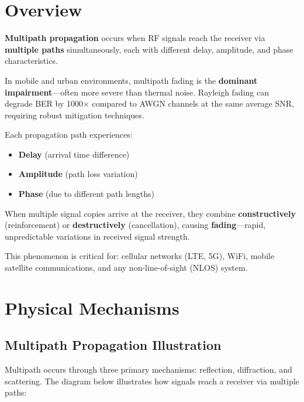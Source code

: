 \section{Overview}

\textbf{Multipath propagation} occurs when RF signals reach the receiver via \textbf{multiple paths} simultaneously, each with different delay, amplitude, and phase characteristics.

\begin{keyconcept}
In mobile and urban environments, multipath fading is the \textbf{dominant impairment}---often more severe than thermal noise. Rayleigh fading can degrade BER by 1000× compared to AWGN channels at the same average SNR, requiring robust mitigation techniques.
\end{keyconcept}

Each propagation path experiences:
\begin{itemize}
\item \textbf{Delay} (arrival time difference)
\item \textbf{Amplitude} (path loss variation)
\item \textbf{Phase} (due to different path lengths)
\end{itemize}

When multiple signal copies arrive at the receiver, they combine \textbf{constructively} (reinforcement) or \textbf{destructively} (cancellation), causing \textbf{fading}---rapid, unpredictable variations in received signal strength.

This phenomenon is critical for: cellular networks (LTE, 5G), WiFi, mobile satellite communications, and any non-line-of-sight (NLOS) system.

\section{Physical Mechanisms}

\subsection{Multipath Propagation Illustration}

Multipath occurs through three primary mechanisms: reflection, diffraction, and scattering. The diagram below illustrates how signals reach a receiver via multiple paths:

